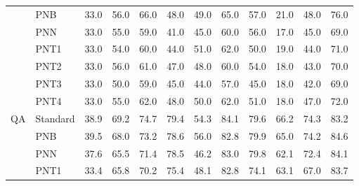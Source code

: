 \begin{table}[t]
{\begin{tabular}{llrrrrrrrrrr}
 & PNB & {\footnotesize 33.0} & {\footnotesize 56.0} & {\footnotesize 66.0} & {\footnotesize 48.0} & {\footnotesize 49.0} & {\footnotesize 65.0} & {\footnotesize 57.0} & {\footnotesize 21.0} & {\footnotesize 48.0} & {\footnotesize 76.0} \\
 & PNN & {\footnotesize 33.0} & {\footnotesize 55.0} & {\footnotesize 59.0} & {\footnotesize 41.0} & {\footnotesize 45.0} & {\footnotesize 60.0} & {\footnotesize 56.0} & {\footnotesize 17.0} & {\footnotesize 45.0} & {\footnotesize 69.0} \\
 & PNT1 & {\footnotesize 33.0} & {\footnotesize 54.0} & {\footnotesize 60.0} & {\footnotesize 44.0} & {\footnotesize 51.0} & {\footnotesize 62.0} & {\footnotesize 50.0} & {\footnotesize 19.0} & {\footnotesize 44.0} & {\footnotesize 71.0} \\
 & PNT2 & {\footnotesize 33.0} & {\footnotesize 56.0} & {\footnotesize 61.0} & {\footnotesize 47.0} & {\footnotesize 48.0} & {\footnotesize 60.0} & {\footnotesize 54.0} & {\footnotesize 18.0} & {\footnotesize 43.0} & {\footnotesize 70.0} \\
 & PNT3 & {\footnotesize 33.0} & {\footnotesize 50.0} & {\footnotesize 59.0} & {\footnotesize 45.0} & {\footnotesize 44.0} & {\footnotesize 57.0} & {\footnotesize 45.0} & {\footnotesize 18.0} & {\footnotesize 42.0} & {\footnotesize 69.0} \\
 & PNT4 & {\footnotesize 33.0} & {\footnotesize 55.0} & {\footnotesize 62.0} & {\footnotesize 48.0} & {\footnotesize 50.0} & {\footnotesize 62.0} & {\footnotesize 51.0} & {\footnotesize 18.0} & {\footnotesize 47.0} & {\footnotesize 72.0} \\
\midrule
QA & Standard & {\footnotesize 38.9} & {\footnotesize 69.2} & {\footnotesize 74.7} & {\footnotesize 79.4} & {\footnotesize 54.3} & {\footnotesize 84.1} & {\footnotesize 79.6} & {\footnotesize 66.2} & {\footnotesize 74.3} & {\footnotesize 83.2} \\
 & PNB & {\footnotesize 39.5} & {\footnotesize 68.0} & {\footnotesize 73.2} & {\footnotesize 78.6} & {\footnotesize 56.0} & {\footnotesize 82.8} & {\footnotesize 79.9} & {\footnotesize 65.0} & {\footnotesize 74.2} & {\footnotesize 84.6} \\
 & PNN & {\footnotesize 37.6} & {\footnotesize 65.5} & {\footnotesize 71.4} & {\footnotesize 78.5} & {\footnotesize 46.2} & {\footnotesize 83.0} & {\footnotesize 79.8} & {\footnotesize 62.1} & {\footnotesize 72.4} & {\footnotesize 84.1} \\
 & PNT1 & {\footnotesize 33.4} & {\footnotesize 65.8} & {\footnotesize 70.2} & {\footnotesize 75.4} & {\footnotesize 48.1} & {\footnotesize 82.8} & {\footnotesize 74.1} & {\footnotesize 63.1} & {\footnotesize 67.0} & {\footnotesize 83.7} \\

\end{tabular}}
\end{table}
